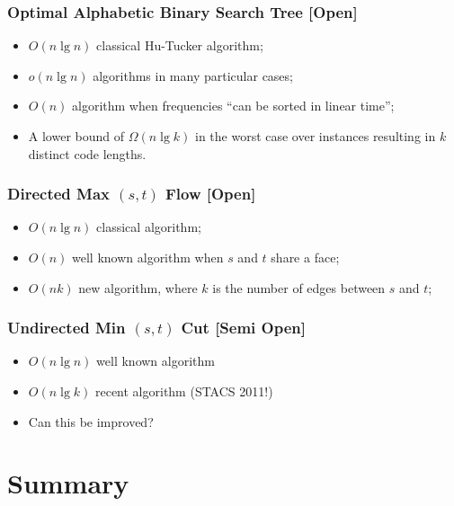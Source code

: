 \documentclass{beamer}
\begin{document}
\begin{frame}
  \frametitle{Optimal Alphabetic Binary Search Tree [Open]}
  \begin{itemize}
  \item $O(n\lg n)$ classical Hu-Tucker algorithm;
  \item $o(n\lg n)$ algorithms in many particular cases;
  \item $O(n)$ algorithm when frequencies ``can be sorted in linear time'';
  \item A lower bound of $\Omega(n\lg k)$ in the worst case over
    instances resulting in $k$ distinct code lengths.
  \end{itemize}
\end{frame}

\begin{TOKEEPSECRET}
  \begin{frame}
    \frametitle{Directed Max $(s,t)$ Flow [Open]}
    \begin{itemize}
    \item $O(n\lg n)$ classical algorithm;
    \item $O(n)$ well known algorithm when $s$ and $t$ share a face;
    \item $O(nk)$ new algorithm, where $k$ is the number of edges
      between $s$ and $t$;
    \end{itemize}
  \end{frame}

  \begin{frame}
    \frametitle{Undirected Min $(s,t)$ Cut [Semi Open]}
    \begin{itemize}
    \item $O(n\lg n)$ well known algorithm
    \item $O(n\lg k)$ recent algorithm (STACS 2011!)
    \item Can this be improved?
    \end{itemize}
  \end{frame}
\end{TOKEEPSECRET}

\section*{Summary}
\end{document}

